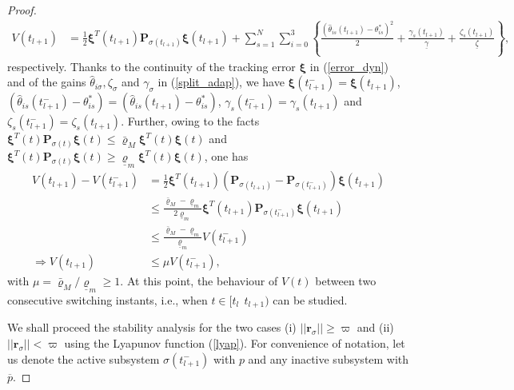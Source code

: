 \begin{proof}
\begin{align*}
	V({t_{l+1}}) &= \frac{1}{2}  \boldsymbol{\xi}^T({t_{l+1}}) \mathbf{P}_{\sigma({t_{l+1}})} \boldsymbol{\xi}({t_{l+1}}) +  \sum_{s=1}^{N} \sum_{i=0}^{3} \left \lbrace \frac{ (\hat{\theta}_{is}({t_{l+1}}) -{\theta}_{is}^{*})^2}{2} + \frac{ \gamma_{s}({t_{l+1}})}{ \underline{\gamma}}+ \frac{\zeta_{s}({t_{l+1}})}{ \underline{\zeta}} \right \rbrace,
	\end{align*}
	respectively. Thanks to the continuity of the tracking error $\boldsymbol \xi$ in (\ref{error_dyn}) and of the gains $\hat{\theta}_{i\sigma},\zeta_\sigma$ and $\gamma_{\sigma}$ in (\ref{split_adap}), we have $\boldsymbol \xi({t_{l+1}^{-}}) = \boldsymbol \xi ({t_{l+1}})$, $(\hat{\theta}_{is}({t_{l+1}^{-}}) -{\theta}_{is}^{*})=(\hat{\theta}_{is}({t_{l+1}}) -{\theta}_{is}^{*})$, $\gamma_{s}({t_{l+1}^{-}}) = \gamma_{s}({t_{l+1}})$ and $\zeta_{s}({t_{l+1}^{-}}) = \zeta_{s}({t_{l+1}})$. Further, owing to the facts $ \boldsymbol{\xi}^T({t}) \mathbf{P}_{\sigma(t)} \boldsymbol{\xi}({t}) \leq {\bar{\varrho}_M} \boldsymbol{\xi}^T({t}) \boldsymbol{\xi}({t})$ and $ \boldsymbol{\xi}^T({t}) \mathbf{P}_{\sigma(t)} \boldsymbol{\xi}({t}) \geq {\underline{\varrho}_m}  \boldsymbol{\xi}^T({t}) \boldsymbol{\xi}({t})$, one has 
	\begin{align}
	 V({t_{l+1}}) - V({t_{l+1}^{-}})  &=  \frac{1}{2} \boldsymbol{\xi}^T({t_{l+1}}) ( \mathbf{P}_{\sigma({t_{l+1}})} -  \mathbf{P}_{\sigma({t_{l+1}^{-}})} ) \boldsymbol{\xi}({t_{l+1}}) \nonumber\\
	&\leq  \frac{{\bar{\varrho}_M} - {\underline{\varrho}_m} }{{2\underline{\varrho}_m} }  \boldsymbol{\xi}^T({t_{l+1}}) \mathbf{P}_{\sigma({t_{l+1}^{-}})} \boldsymbol{\xi}({t_{l+1}})  \nonumber\\
	&\leq \frac{{\bar{\varrho}_M} - {\underline{\varrho}_m} }{{\underline{\varrho}_m} } V(t_{l+1}^{-}) \nonumber \\
 \Rightarrow V({t_{l+1}})  &\leq \mu V(t_{l+1}^{-}), \label{mu}
	\end{align}
	with $\mu = {\bar{\varrho}_M} / {\underline{\varrho}_m} \geq 1$. At this point, the behaviour of $V(t)$ between two consecutive switching instants, i.e., when $t \in [t_l~~t_{l+1})$ can be studied. 
	
	We shall proceed the stability analysis for the two cases (i) $|| \mathbf{r}_\sigma || \geq \varpi$ and (ii) $|| \mathbf{r}_\sigma || < \varpi$ using the Lyapunov function (\ref{lyap}). For convenience of notation, let us denote the active subsystem ${\sigma({t_{l+1}^{-}})}$ with $p$ and any inactive subsystem with $\overline{p}$.
	

\end{proof}
